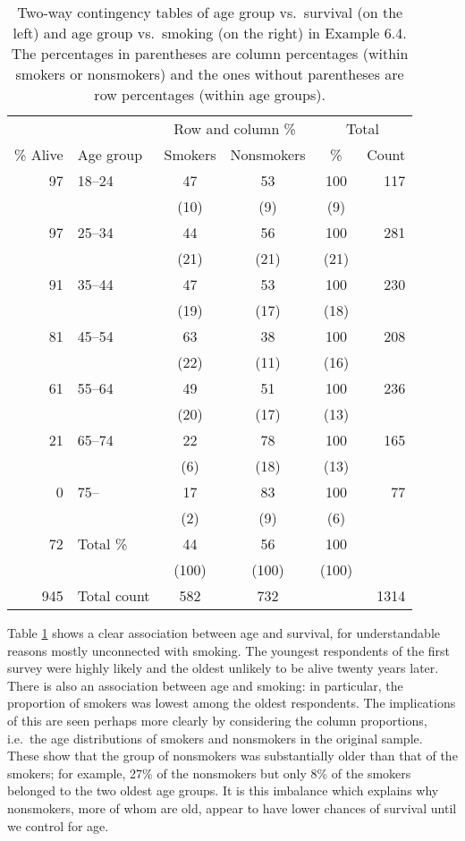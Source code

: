 \begin{table}[t]
\caption{Two-way contingency tables of age group vs.\ survival (on the
left) and age group vs.\ smoking (on the right)
in Example 6.4. The percentages in parentheses are column percentages
(within smokers or nonsmokers) and the ones without parentheses are row
percentages (within age groups).
}
\label{t_whickham3}
\begin{center}
\begin{tabular}{|r||l||cc|c||r|}\hline
& & \multicolumn{2}{c}{Row and column \%} &
\multicolumn{2}{|c|}{Total} \\
\% Alive & Age group & Smokers & Nonsmokers &
\multicolumn{1}{c}{\%} & Count \\ \hline
97 & 18--24 & 47 & 53 & 100 & 117 \\
& & (10) & (9) & (9) & \\
97 & 25--34 &  44 & 56 & 100 & 281 \\
& & (21) & (21) & (21) & \\
91 & 35--44 & 47 & 53 & 100 & 230 \\
& & (19) & (17) & (18) & \\
81 & 45--54 & 63 & 38 & 100 & 208 \\
& & (22) & (11) & (16) & \\
61 & 55--64 & 49 & 51 & 100 & 236 \\
& & (20) & (17) & (13) & \\
21 & 65--74 & 22 & 78 & 100 & 165 \\
& & (6) & (18) & (13) & \\
0 & 75-- & 17 & 83 & 100 & 77 \\
& & (2) & (9) & (6) & \\
\hline
72 & Total \% & 44 & 56 & 100 & \\
& & (100) & (100) & (100) & \\ \hline
945 & Total count & 582 & 732 & & 1314 \\
\hline
\end{tabular}
\end{center}
\end{table}

Table \ref{t_whickham3} shows a clear association between age and
survival, for understandable reasons mostly unconnected with smoking.
The youngest respondents of the first survey were highly likely and the
oldest unlikely to be alive twenty years later. There is also an
association between age and smoking: in particular, the proportion of
smokers was lowest among the oldest respondents. The implications of
this are seen perhaps more clearly by considering the column
proportions, i.e.\ the age distributions of smokers and nonsmokers in
the original sample. These show that the group of nonsmokers was
substantially older than that of the smokers; for example, 27\% of the
nonsmokers but only 8\% of the smokers belonged to the two oldest age
groups. It is this imbalance which explains why nonsmokers, more of whom
are old, appear to have lower chances of survival until we control for
age.

